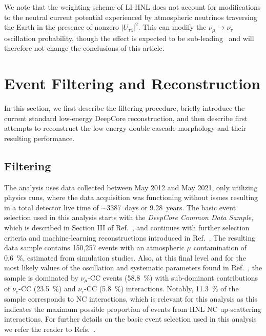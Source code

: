 \documentclass[
    aps,
    prd,
    reprint,
    amsmath,
    amssymb,
    nofootinbib,
    superscriptaddress,
    floatfix
]{revtex4-2}
\begin{document}
We note that the weighting scheme of \textsc{LI-HNL} does not account for modifications to the neutral current potential experienced by atmospheric neutrinos traversing the Earth in the presence of nonzero $|U_{\tau 4}|^2$.
This can modify the $\nu_\mu \to \nu_\tau$ oscillation probability, though the effect is expected to be sub-leading~\cite{Sahoo:2023mpj} and will therefore not change the conclusions of this article.



\section{\label{sec:filter_and_reco}Event Filtering and Reconstruction}

In this section, we first describe the filtering procedure, briefly introduce the current standard low-energy DeepCore reconstruction, and then describe first attempts to reconstruct the low-energy double-cascade morphology and their resulting performance.


\subsection{\label{sec:filter}Filtering}

The analysis uses data collected between May 2012 and May 2021, only utilizing physics runs, where the data acquisition was functioning without issues resulting in a total detector live time of $\sim$\SI{3387}{days} or \SI{9.28}{years}. The basic event selection used in this analysis starts with the \textit{DeepCore Common Data Sample}, which is described in Section III of Ref.~\cite{IceCubeCollaboration:2023wtb}, and continues with further selection criteria and machine-learning reconstructions introduced in Ref.~\cite{IceCube:2024xjj}.
The resulting data sample contains 150,257 events with an atmospheric $\mu$ contamination of \SI{0.6}{\percent}, estimated from simulation studies.
Also, at this final level and for the most likely values of the oscillation and systematic parameters found in Ref.~\cite{IceCube:2024xjj}, the sample is dominated by $\nu_\mu$-CC events (\SI{58.8}{\percent}) with sub-dominant contributions of $\nu_e$-CC (\SI{23.5}{\percent}) and $\nu_\tau$-CC (\SI{5.8}{\percent}) interactions.
Notably, \SI{11.3}{\percent} of the sample corresponds to NC interactions, which is relevant for this analysis as this indicates the maximum possible proportion of events from HNL NC up-scattering interactions.
For further details on the basic event selection used in this analysis we refer the reader to Refs.~\cite{IceCubeCollaboration:2023wtb,IceCube:2024xjj}.
\end{document}
